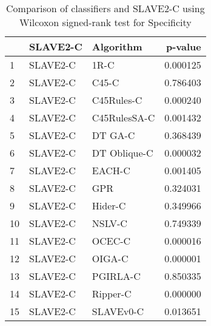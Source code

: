 \begin{table}
\footnotesize
\caption{Comparison of classifiers and SLAVE2-C using Wilcoxon signed-rank test for Specificity}
\label{tab:SLAVE2-C wilcoxon Specificity comparison}
\begin{tabular}{lllr}
\hline
 & SLAVE2-C & Algorithm & p-value \\
\hline
1 & SLAVE2-C & 1R-C & 0.000125 \\
2 & SLAVE2-C & C45-C & 0.786403 \\
3 & SLAVE2-C & C45Rules-C & 0.000240 \\
4 & SLAVE2-C & C45RulesSA-C & 0.001432 \\
5 & SLAVE2-C & DT GA-C & 0.368439 \\
6 & SLAVE2-C & DT Oblique-C & 0.000032 \\
7 & SLAVE2-C & EACH-C & 0.001405 \\
8 & SLAVE2-C & GPR & 0.324031 \\
9 & SLAVE2-C & Hider-C & 0.349966 \\
10 & SLAVE2-C & NSLV-C & 0.749339 \\
11 & SLAVE2-C & OCEC-C & 0.000016 \\
12 & SLAVE2-C & OIGA-C & 0.000001 \\
13 & SLAVE2-C & PGIRLA-C & 0.850335 \\
14 & SLAVE2-C & Ripper-C & 0.000000 \\
15 & SLAVE2-C & SLAVEv0-C & 0.013651 \\
\hline
\end{tabular}
\end{table}

